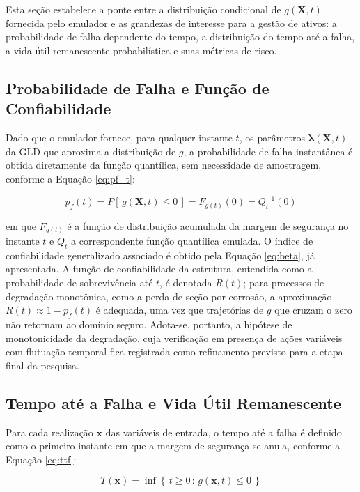 Esta seção estabelece a ponte entre a distribuição condicional de $g(\mathbf{X},t)$ fornecida pelo emulador e as grandezas de interesse para a gestão de ativos: a probabilidade de falha dependente do tempo, a distribuição do tempo até a falha, a vida útil remanescente probabilística e suas métricas de risco.

\subsection{Probabilidade de Falha e Função de Confiabilidade}

Dado que o emulador fornece, para qualquer instante $t$, os parâmetros $\hat{\boldsymbol{\lambda}}(\mathbf{X},t)$ da GLD que aproxima a distribuição de $g$, a probabilidade de falha instantânea é obtida diretamente da função quantílica, sem necessidade de amostragem, conforme a Equação \eqref{eq:pf_t}:

\begin{equation}\label{eq:pf_t}
p_f(t) = P\left[\, g(\mathbf{X}, t) \leq 0 \,\right] = F_{g(t)}(0) = Q^{-1}_{t}(0)
\end{equation}

em que $F_{g(t)}$ é a função de distribuição acumulada da margem de segurança no instante $t$ e $Q_t$ a correspondente função quantílica emulada. O índice de confiabilidade generalizado associado é obtido pela Equação \eqref{eq:beta}, já apresentada. A função de confiabilidade da estrutura, entendida como a probabilidade de sobrevivência até $t$, é denotada $R(t)$; para processos de degradação monotônica, como a perda de seção por corrosão, a aproximação $R(t) \approx 1 - p_f(t)$ é adequada, uma vez que trajetórias de $g$ que cruzam o zero não retornam ao domínio seguro. Adota-se, portanto, a hipótese de monotonicidade da degradação, cuja verificação em presença de ações variáveis com flutuação temporal fica registrada como refinamento previsto para a etapa final da pesquisa.

\subsection{Tempo até a Falha e Vida Útil Remanescente}

Para cada realização $\mathbf{x}$ das variáveis de entrada, o tempo até a falha é definido como o primeiro instante em que a margem de segurança se anula, conforme a Equação \eqref{eq:ttf}:

\begin{equation}\label{eq:ttf}
T(\mathbf{x}) = \inf\left\{\, t \geq 0 \,:\, g(\mathbf{x}, t) \leq 0 \,\right\}
\end{equation}


